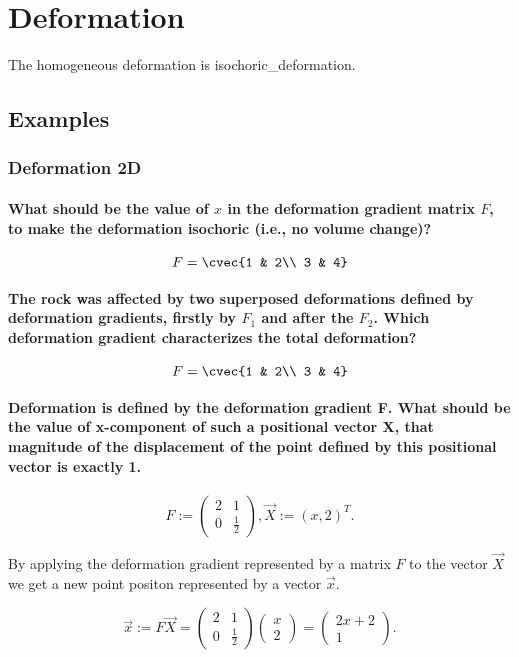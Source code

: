 \chapter{Deformation}

The homogeneous deformation is \Gls{isochoric_deformation}.

\section{Examples}

\subsection{Deformation 2D}
 
\subsubsection{What should be the value of $x$ in the deformation gradient matrix $F$, to make the deformation isochoric (i.e., no volume change)? }

$$
F = \cvec{1 & 2\\ 3 & 4}
$$

\subsubsection{The rock was affected by two superposed deformations defined by deformation gradients, firstly by $F_1$ and after the $F_2$. Which deformation gradient characterizes the total deformation?}

$$
F = \cvec{1 & 2\\ 3 & 4}
$$

\subsubsection{Deformation is defined by the deformation gradient F. What should be the value of x-component of such a positional vector X, that magnitude of the displacement of the point defined by this positional vector is exactly 1.} $$ F := \begin{pmatrix} 2 & 1\\ 0 & \frac{1}{2} \end{pmatrix},  \vec{X} := (x, 2)^T. $$

By applying the deformation gradient represented by a matrix $F$ to the vector $\vec{X}$ we get a new point positon represented by a vector $\vec{x}$.

$$ 
\vec{x} := F\vec{X} = \begin{pmatrix} 2 & 1\\ 0 & \frac{1}{2}  \end{pmatrix} \begin{pmatrix} x \\ 2 \end{pmatrix} = \begin{pmatrix} 2x + 2  \\ 1 \end{pmatrix}.
$$

